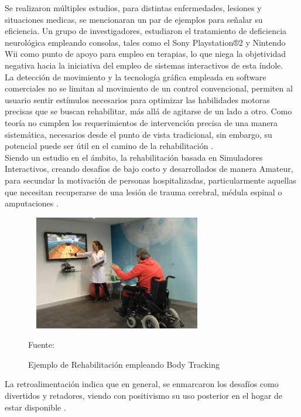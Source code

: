 Se realizaron múltiples estudios, para distintas enfermedades, lesiones y situaciones medicas, se mencionaran un par de ejemplos para señalar su eficiencia. Un grupo de investigadores, estudiaron el tratamiento de deficiencia neurológica empleando consolas, tales como el Sony Playstation®2 \cite{rand2008sony} y Nintendo Wii \cite{herz2013nintendo} como punto de apoyo para empleo en terapias, lo que niega la objetividad negativa hacia la iniciativa del empleo de sistemas interactivos de esta índole.\\

La detección de movimiento y la tecnología gráfica empleada en software comerciales no se limitan al movimiento de un control convencional, permiten al usuario sentir estímulos necesarios para optimizar las habilidades motoras precisas que se buscan rehabilitar, más allá de agitarse de un lado a otro. Como teoría no cumplen los requerimientos de intervención precisa de una manera sistemática, necesarios desde el punto de vista tradicional, sin embargo, su potencial puede ser útil en el camino de la rehabilitación \cite{lange2011markerless}. \\

Siendo un estudio en el ámbito, la rehabilitación basada en Simuladores Interactivos, creando desafíos de bajo costo y desarrollados de manera Amateur,  para secundar la motivación de personas hospitalizadas, particularmente aquellas que necesitan recuperarse de una lesión de trauma cerebral, médula espinal o amputaciones \cite{lange2011markerless}. 
\begin{figure}[t!]
	\centering
	\includegraphics[width=8cm,height=5cm,]{./Images/rehabilitacionexample.jpg}
	\caption{Ejemplo de Rehabilitación empleando Body Tracking}
	\footnotesize Fuente: \cite{rehabilitacionexample}
	\label{rehabexample}
\end{figure}
La retroalimentación indica que en general, se enmarcaron los desafíos como divertidos y retadores, viendo con positivismo su uso posterior en el hogar de estar disponible \cite{lange2011leveraging}.\\

